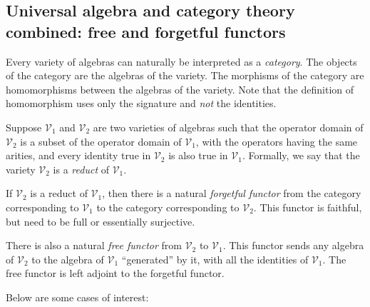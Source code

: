 \documentclass{ucetd}
\begin{document}
\subsection{Universal algebra and category theory combined: free and forgetful functors}\label{appsec:free-forgetful}

Every variety of algebras can naturally be interpreted as a {\em
  category}. The objects of the category are the algebras of the
variety. The morphisms of the category are homomorphisms between the
algebras of the variety. Note that the definition of homomorphism uses
only the signature and {\em not} the identities.

Suppose $\mathcal{V}_1$ and $\mathcal{V}_2$ are two varieties of
algebras such that the operator domain of $\mathcal{V}_2$ is a subset
of the operator domain of $\mathcal{V}_1$, with the operators having
the same arities, and every identity true in $\mathcal{V}_2$ is also
true in $\mathcal{V}_1$. Formally, we say that the variety
$\mathcal{V}_2$ is a {\em reduct} of $\mathcal{V}_1$.

If $\mathcal{V}_2$ is a reduct of $\mathcal{V}_1$, then there is a
natural {\em forgetful functor} from the category corresponding to
$\mathcal{V}_1$ to the category corresponding to $\mathcal{V}_2$. This
functor is faithful, but need to be full or essentially surjective.

There is also a natural {\em free functor} from $\mathcal{V}_2$ to
$\mathcal{V}_1$. This functor sends any algebra of $\mathcal{V}_2$ to
the algebra of $\mathcal{V}_1$ ``generated'' by it, with all the
identities of $\mathcal{V}_1$. The free functor is left adjoint to the
forgetful functor.

Below are some cases of interest:
\end{document}
